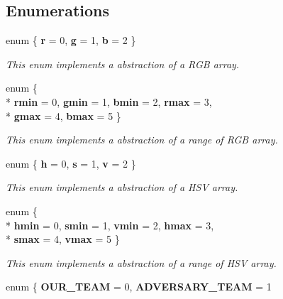 \subsection*{Enumerations}
\begin{DoxyCompactItemize}
\item 
enum \{ {\bfseries r} = 0, 
{\bfseries g} = 1, 
{\bfseries b} = 2
 \}\hypertarget{namespacecommon_a491fb143df4d6e143a19de8d5863ef28}{}\label{namespacecommon_a491fb143df4d6e143a19de8d5863ef28}
\begin{DoxyCompactList}\small\item\em This enum implements a abstraction of a R\+GB array. \end{DoxyCompactList}
\item 
enum \{ \\*
{\bfseries rmin} = 0, 
{\bfseries gmin} = 1, 
{\bfseries bmin} = 2, 
{\bfseries rmax} = 3, 
\\*
{\bfseries gmax} = 4, 
{\bfseries bmax} = 5
 \}\hypertarget{namespacecommon_a497fe38f750672b3984a9099aa7b7eed}{}\label{namespacecommon_a497fe38f750672b3984a9099aa7b7eed}
\begin{DoxyCompactList}\small\item\em This enum implements a abstraction of a range of R\+GB array. \end{DoxyCompactList}
\item 
enum \{ {\bfseries h} = 0, 
{\bfseries s} = 1, 
{\bfseries v} = 2
 \}\hypertarget{namespacecommon_ad19e2da0c005a20bb6e218b5393d0994}{}\label{namespacecommon_ad19e2da0c005a20bb6e218b5393d0994}
\begin{DoxyCompactList}\small\item\em This enum implements a abstraction of a H\+SV array. \end{DoxyCompactList}
\item 
enum \{ \\*
{\bfseries hmin} = 0, 
{\bfseries smin} = 1, 
{\bfseries vmin} = 2, 
{\bfseries hmax} = 3, 
\\*
{\bfseries smax} = 4, 
{\bfseries vmax} = 5
 \}\hypertarget{namespacecommon_aca4dbe5edbfb61860448876cc31ea0d6}{}\label{namespacecommon_aca4dbe5edbfb61860448876cc31ea0d6}
\begin{DoxyCompactList}\small\item\em This enum implements a abstraction of a range of H\+SV array. \end{DoxyCompactList}
\item 
enum \{ {\bfseries O\+U\+R\+\_\+\+T\+E\+AM} = 0, 
{\bfseries A\+D\+V\+E\+R\+S\+A\+R\+Y\+\_\+\+T\+E\+AM} = 1

\end{DoxyCompactItemize}
